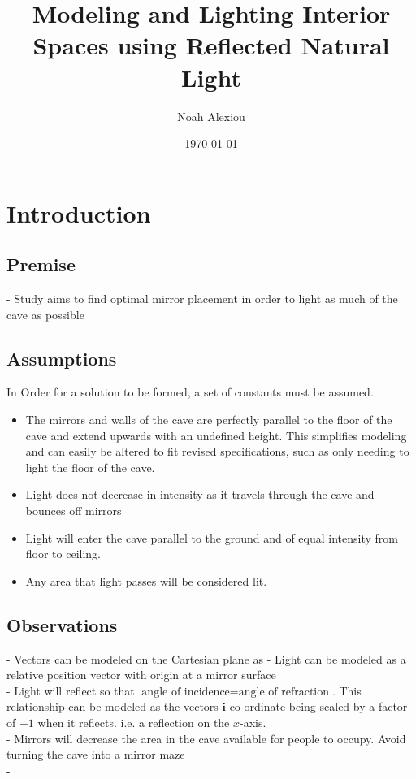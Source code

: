 \documentclass[11pt, letterpaper]{article}
\begin{document}
\title{Modeling and Lighting Interior Spaces using Reflected Natural Light}
\author{Noah Alexiou}
\date{\today}
\maketitle
\newpage
\tableofcontents
\newpage


\section{Introduction}


\subsection{Premise}
- Study aims to find optimal mirror placement in order to light as much of the cave as possible




\subsection{Assumptions}
\par
In Order for a solution to be formed, a set of constants must be assumed.
\begin{itemize}
	\item The mirrors and walls of the cave are perfectly parallel to the floor of the cave and extend upwards with an undefined height. This simplifies modeling and can easily be altered to fit revised specifications, such as only needing to light the floor of the cave.
	\item Light does not decrease in intensity as it travels through the cave and bounces off mirrors
	\item Light will enter the cave parallel to the ground and of equal intensity from floor to ceiling.
	\item Any area that light passes will be considered lit.
\end{itemize}

\subsection{Observations}
\par

- Vectors can be modeled on the Cartesian plane as 
- Light can be modeled as a relative position vector with origin at a mirror surface
\\
- Light will reflect so that $\textrm{angle  of incidence} = \textrm{angle of refraction}$. This relationship can be modeled as the vectors $\bm{i}$ co-ordinate being scaled by a factor of $-1$ when it reflects. i.e. a reflection on the $x$-axis.
\\
- Mirrors will decrease the area in the cave available for people to occupy. Avoid turning the cave into a mirror maze
\\
- 
\end{document}
